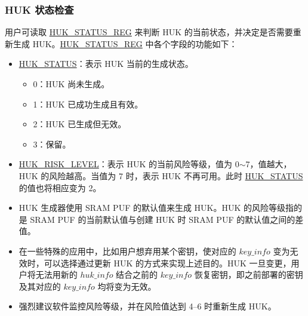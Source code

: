 \documentclass[main\_\_CN.tex]{subfiles}
\begin{document}
\subsubsection{HUK 状态检查}
用户可读取 \hyperref[regdesc:HUKSTATUSREG]{HUK\_STATUS\_REG} 来判断 HUK 的当前状态，并决定是否需要重新生成 HUK。\hyperref[regdesc:HUKSTATUSREG]{HUK\_STATUS\_REG} 中各个字段的功能如下：
\begin{itemize}
    \item \hyperref[fielddesc:HUKSTATUS]{HUK\_STATUS}：表示 HUK 当前的生成状态。
    \begin{itemize}
        \item 0：HUK 尚未生成。
        \item 1：HUK 已成功生成且有效。
        \item 2：HUK 已生成但无效。
        \item 3：保留。
    \end{itemize}
    \item \hyperref[fielddesc:HUKRISKLEVEL]{HUK\_RISK\_LEVEL}：表示 HUK 的当前风险等级，值为 0$\sim$7，值越大，HUK 的风险越高。当值为 7 时，表示 HUK 不再可用。此时  \hyperref[fielddesc:HUKSTATUS]{HUK\_STATUS} 的值也将相应变为 2。
\end{itemize}

\vspace{-0.5em}
\begin{tiplisting}
\vspace{-2em}
\begin{itemize}
    \item HUK 生成器使用 SRAM PUF 的默认值来生成 HUK。HUK 的风险等级指的是 SRAM PUF 的当前默认值与创建 HUK 时 SRAM PUF 的默认值之间的差值。
    \item 在一些特殊的应用中，比如用户想弃用某个密钥，使对应的 \hyperref[para:keyinfo]{\begin{math}key\_info\end{math}} 变为无效时，可以选择通过更新 HUK 的方式来实现上述目的。HUK 一旦变更，用户将无法用新的 \hyperref[para:hukinfo]{\begin{math}huk\_info\end{math}} 结合之前的 \hyperref[para:keyinfo]{\begin{math}key\_info\end{math}} 恢复密钥，即之前部署的密钥及其对应的 \hyperref[para:keyinfo]{\begin{math}key\_info\end{math}} 均将变为无效。
    \item 强烈建议软件监控风险等级，并在风险值达到 4–6 时重新生成 HUK。
\end{itemize}
\end{tiplisting}
\end{document}
